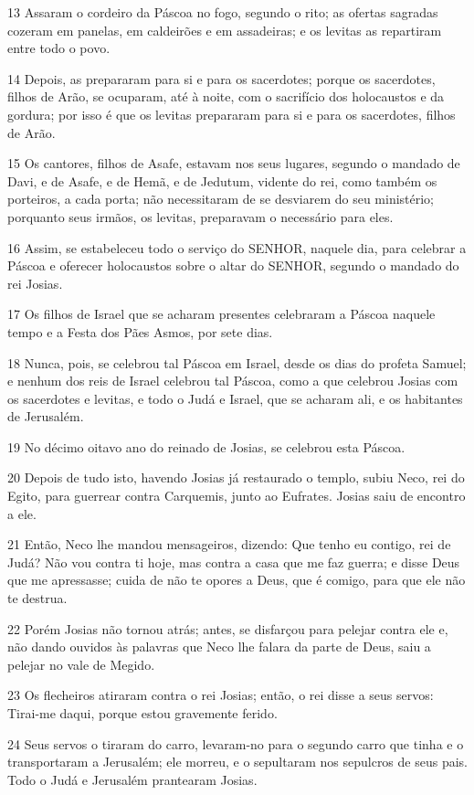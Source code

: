 \par 13 Assaram o cordeiro da Páscoa no fogo, segundo o rito; as ofertas sagradas cozeram em panelas, em caldeirões e em assadeiras; e os levitas as repartiram entre todo o povo.
\par 14 Depois, as prepararam para si e para os sacerdotes; porque os sacerdotes, filhos de Arão, se ocuparam, até à noite, com o sacrifício dos holocaustos e da gordura; por isso é que os levitas prepararam para si e para os sacerdotes, filhos de Arão.
\par 15 Os cantores, filhos de Asafe, estavam nos seus lugares, segundo o mandado de Davi, e de Asafe, e de Hemã, e de Jedutum, vidente do rei, como também os porteiros, a cada porta; não necessitaram de se desviarem do seu ministério; porquanto seus irmãos, os levitas, preparavam o necessário para eles.
\par 16 Assim, se estabeleceu todo o serviço do SENHOR, naquele dia, para celebrar a Páscoa e oferecer holocaustos sobre o altar do SENHOR, segundo o mandado do rei Josias.
\par 17 Os filhos de Israel que se acharam presentes celebraram a Páscoa naquele tempo e a Festa dos Pães Asmos, por sete dias.
\par 18 Nunca, pois, se celebrou tal Páscoa em Israel, desde os dias do profeta Samuel; e nenhum dos reis de Israel celebrou tal Páscoa, como a que celebrou Josias com os sacerdotes e levitas, e todo o Judá e Israel, que se acharam ali, e os habitantes de Jerusalém.
\par 19 No décimo oitavo ano do reinado de Josias, se celebrou esta Páscoa.
\par 20 Depois de tudo isto, havendo Josias já restaurado o templo, subiu Neco, rei do Egito, para guerrear contra Carquemis, junto ao Eufrates. Josias saiu de encontro a ele.
\par 21 Então, Neco lhe mandou mensageiros, dizendo: Que tenho eu contigo, rei de Judá? Não vou contra ti hoje, mas contra a casa que me faz guerra; e disse Deus que me apressasse; cuida de não te opores a Deus, que é comigo, para que ele não te destrua.
\par 22 Porém Josias não tornou atrás; antes, se disfarçou para pelejar contra ele e, não dando ouvidos às palavras que Neco lhe falara da parte de Deus, saiu a pelejar no vale de Megido.
\par 23 Os flecheiros atiraram contra o rei Josias; então, o rei disse a seus servos: Tirai-me daqui, porque estou gravemente ferido.
\par 24 Seus servos o tiraram do carro, levaram-no para o segundo carro que tinha e o transportaram a Jerusalém; ele morreu, e o sepultaram nos sepulcros de seus pais. Todo o Judá e Jerusalém prantearam Josias.
